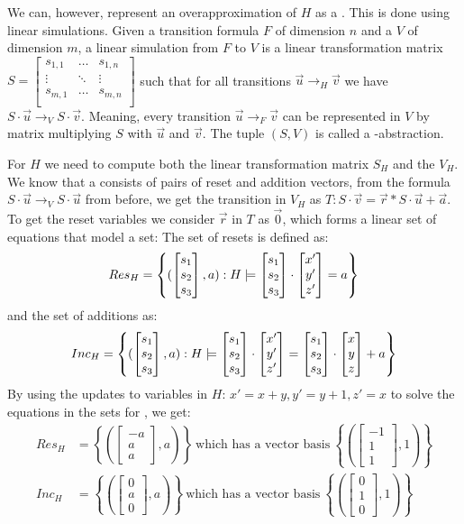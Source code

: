 We can, however, represent an overapproximation of $H$ as a \qvasr. This is done using linear simulations. Given a transition formula $F$ of dimension $n$ and a \qvasr $V$ of dimension $m$, a linear simulation from $F$ to $V$ is a linear transformation matrix \\ 
$S = 
\begin{bmatrix}
	 s_{1 ,1} & \ldots & s_{1, n} \\
	\vdots & \ddots & \vdots \\
	s_{m ,1} & \ldots & s_{m, n} \\
\end{bmatrix}$ 
such that for all transitions $\vec{u} \rightarrow_H \vec{v}$ we have $S\cdot\vec{u} \rightarrow_V S\cdot\vec{v}$. Meaning, every transition $\vec{u} \rightarrow_F \vec{v}$ can be represented in $V$ by matrix multiplying $S$ with $\vec{u}$ and $\vec{v}$. The tuple $(S, V)$ is called a \qvasr-abstraction. \par For $H$ we need to compute both the linear transformation matrix $S_H$ and the \qvasr $V_H$. We know that a \qvasr consists of pairs of reset and addition vectors, from the formula $S \cdot \vec{u} \rightarrow_V S \cdot \vec{u}$ from before, we get the transition in $V_H$ as $T: S\cdot\vec{v} = \vec{r}*S\cdot\vec{u} + \vec{a}$. \\ To get the reset variables we consider $\vec{r}$ in $T$ as $\vec{0}$, which forms a linear set of equations that model a set:
The set of resets is defined as: 
\begin{equation*}
	Res_H = \left\{ (\begin{bmatrix} s_1 \\ s_2 \\ s_3 \end{bmatrix}, a) : H \models \begin{bmatrix} s_1 \\ s_2 \\ s_3 \end{bmatrix} \cdot \begin{bmatrix} x' \\ y' \\ z' \end{bmatrix} = a \right\}	
\end{equation*}
 and the set of additions as:
\begin{equation*}
	Inc_H = \left\{(\begin{bmatrix} s_1 \\ s_2 \\ s_3 \end{bmatrix}, a) : H \models \begin{bmatrix} s_1 \\ s_2 \\ s_3 \end{bmatrix} \cdot \begin{bmatrix} x' \\ y' \\ z' \end{bmatrix} = \begin{bmatrix} s_1 \\ s_2 \\ s_3 \end{bmatrix} \cdot \begin{bmatrix} x \\ y \\ z \end{bmatrix} + a\right\}	
\end{equation*}
By using the updates to variables in $H$: $x' = x + y, y' = y + 1, z' = x$ to solve the equations in the sets for \s, we get:
\begin{align*}
	Res_H &= \left\{ (\begin{bmatrix} -a \\ a \\ a \end{bmatrix}, a) \right\}\ \text{which has a vector basis}\ \left\{(\begin{bmatrix} -1 \\ 1 \\ 1 \end{bmatrix}, 1)\right\} \\
	Inc_H &= \left\{ (\begin{bmatrix} 0 \\ a \\ 0 \end{bmatrix}, a) \right\}\ \text{which has a vector basis}\ \left\{(\begin{bmatrix} 0 \\ 1 \\ 0 \end{bmatrix}, 1)\right\}
\end{align*}
